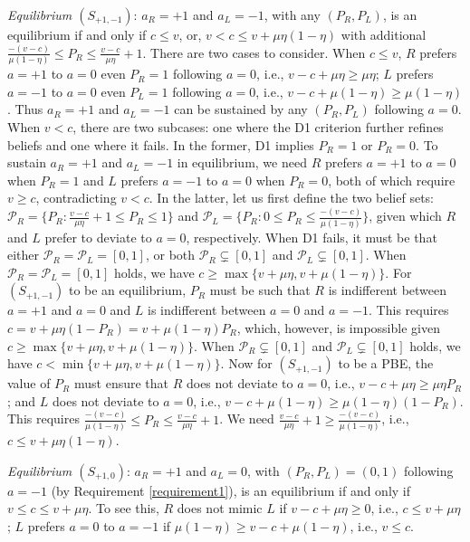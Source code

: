 \documentclass[english,12pt]{article}
\theoremstyle{plain}
\theoremstyle{plain}
\theoremstyle{definition}
\theoremstyle{definition}
\theoremstyle{assumption}
\theoremstyle{plain}
\theoremstyle{plain}
\theoremstyle{plain}
\theoremstyle{plain}
\theoremstyle{definition}%
\theoremstyle{plain}
\theoremstyle{plain}
\theoremstyle{plain}
\theoremstyle{plain}
\theoremstyle{plain}
\theoremstyle{plain}
\begin{document}
\textit{Equilibrium $(S_{+1,-1})$}: $a_R=+1$ and $a_L=-1$, with any $(P_R,P_L)$, is an equilibrium if and only if $c\leq v$, or, $v<c\leq v+\mu\eta(1-\eta)$ with additional $\frac{-(v-c)}{\mu(1-\eta)}\leq P_R\leq \frac{v-c}{\mu\eta}+1$. There are two cases to consider. When $c\leq v$, $R$ prefers $a=+1$ to $a=0$ even $P_R=1$ following $a=0$, i.e., $v-c+\mu\eta\geq \mu\eta$; $L$ prefers $a=-1$ to $a=0$ even $P_L=1$ following $a=0$, i.e., $v-c+\mu(1-\eta)\geq \mu(1-\eta)$. Thus $a_R=+1$ and $a_L=-1$ can be sustained by any $(P_R,P_L)$ following $a=0$. When $v<c$, there are two subcases: one where the D1 criterion further refines beliefs and one where it fails. In the former, D1 implies $P_R=1$ or $P_R=0$. To sustain $a_R=+1$ and $a_L=-1$ in equilibrium, we need $R$ prefers $a=+1$ to $a=0$ when $P_R=1$ and $L$ prefers $a=-1$ to $a=0$ when $P_R=0$, both of which require $v\geq c$, contradicting $v<c$. In the latter, let us first define the two belief sets: $\mathcal{P}_R = \{P_R:\frac{v-c}{\mu\eta}+1\leq P_R\leq 1\}$ and $\mathcal{P}_L = \{P_R:0\leq P_R\leq \frac{-(v-c)}{\mu(1-\eta)}\}$, given which $R$ and $L$ prefer to deviate to $a=0$, respectively. When D1 fails, it must be that either $\mathcal{P}_R=\mathcal{P}_L=[0,1]$, or both $\mathcal{P}_R\subsetneq [0,1]$ and $\mathcal{P}_L\subsetneq [0,1]$. When $\mathcal{P}_R=\mathcal{P}_L=[0,1]$ holds, we have $c\geq \max\{v+\mu\eta, v+\mu(1-\eta)\}$. For $(S_{+1,-1})$ to be an equilibrium, $P_R$ must be such that $R$ is indifferent between $a=+1$ and $a=0$ and $L$ is indifferent between $a=0$ and $a=-1$. This requires $c=v+\mu\eta(1-P_R) = v+\mu(1-\eta)P_R$, which, however, is impossible given $c\geq \max\{v+\mu\eta, v+\mu(1-\eta)\}$. When $\mathcal{P}_R\subsetneq [0,1]$ and $\mathcal{P}_L\subsetneq [0,1]$ holds, we have $c<\min\{v+\mu\eta,v+\mu(1-\eta)\}$. Now for $(S_{+1,-1})$ to be a PBE, the value of $P_R$ must ensure that $R$ does not deviate to $a=0$, i.e., $v-c+\mu\eta\geq \mu\eta P_R$; and $L$ does not deviate to $a=0$, i.e., $v-c+\mu(1-\eta)\geq \mu(1-\eta)(1-P_R)$. This requires $\frac{-(v-c)}{\mu(1-\eta)}\leq P_R\leq \frac{v-c}{\mu\eta}+1$. We need $\frac{v-c}{\mu\eta}+1\geq \frac{-(v-c)}{\mu(1-\eta)}$, i.e., $c\leq v+ \mu\eta(1-\eta)$.


\textit{Equilibrium $(S_{+1,0})$}: $a_R=+1$ and $a_L=0$, with $(P_R,P_L)=(0,1)$ following $a=-1$ (by Requirement \ref{requirement1}), is an equilibrium if and only if $v\leq c\leq v+\mu\eta$. To see this, $R$ does not mimic $L$ if $v-c+\mu\eta\geq 0$, i.e., $c\leq v+\mu\eta$; $L$ prefers $a=0$ to $a=-1$ if $\mu(1-\eta)\geq v-c+\mu(1-\eta)$, i.e., $v\leq c$.
\end{document}
